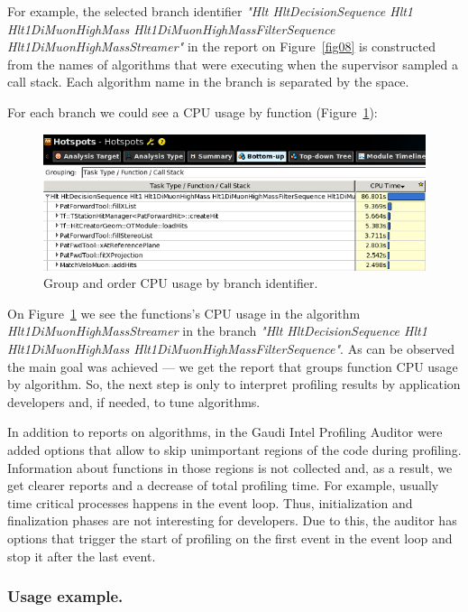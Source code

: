 \documentclass[a4paper]{jpconf}
\begin{document}
For example, the selected branch identifier {\it "Hlt HltDecisionSequence Hlt1 Hlt1DiMuonHighMass Hlt1DiMuonHighMassFilterSequence Hlt1DiMuonHighMassStreamer"} in the report on Figure~\ref{fig08} is constructed from the names of algorithms that were executing 
when the \amp supervisor sampled a call stack. Each algorithm name in the branch is separated by the space. 

For each branch we could see a CPU usage by function (Figure~\ref{fig09}):

\begin{figure}[H]
\begin{minipage}{\textwidth}
\includegraphics[width=\textwidth]{figs/fig09.png}
\caption{\label{fig09}Group and order CPU usage by branch identifier.}
\end{minipage}
\end{figure}

On Figure~\ref{fig09} we see the functions's CPU usage  in the algorithm {\it Hlt1DiMuonHighMassStreamer} in the branch 
{\it "Hlt HltDecisionSequence Hlt1 Hlt1DiMuonHighMass Hlt1DiMuonHighMassFilterSequence"}. 
As can be observed the main goal was achieved --- we get the report that groups function CPU usage by algorithm.
So, the next step is only to interpret profiling results by application developers and, if needed, to tune algorithms.

In addition to reports on algorithms, in the Gaudi Intel Profiling Auditor were added options that allow to skip 
unimportant regions of the code during profiling. Information about functions in those regions is not collected and, 
as a result, we get clearer reports and a decrease of total profiling time. For example, usually time critical 
processes happens in the event loop. Thus, initialization and finalization phases are not interesting for developers. 
Due to this, the auditor has options that trigger the start of  profiling on the first event in the event loop 
and stop it after the last event. 

\subsubsection{Usage example.}
\end{document}
